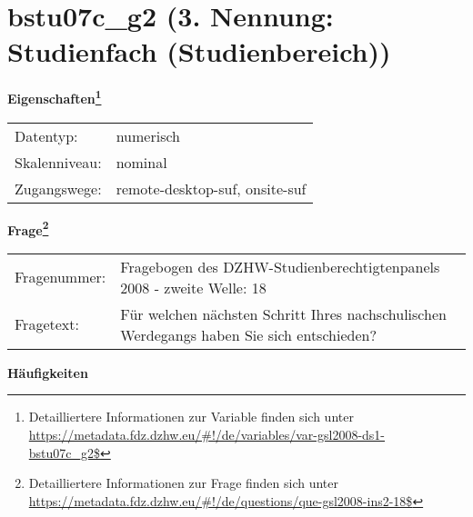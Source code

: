 
    \setcounter{footnote}{0}

    \vspace*{-1.8cm}
	\section{bstu07c\_g2 (3. Nennung: Studienfach (Studienbereich))}
	\label{section:bstu07c_g2}



    \vspace*{0.5cm}
    \noindent\textbf{Eigenschaften\footnote{Detailliertere Informationen zur Variable finden sich unter
		\url{https://metadata.fdz.dzhw.eu/\#!/de/variables/var-gsl2008-ds1-bstu07c_g2$}}}\\
	\begin{tabularx}{\hsize}{@{}lX}
	Datentyp: & numerisch \\
	Skalenniveau: & nominal \\
	Zugangswege: &
	  remote-desktop-suf, 
	  onsite-suf
 \\
    \end{tabularx}



				\vspace*{0.5cm}
                \noindent\textbf{Frage\footnote{Detailliertere Informationen zur Frage finden sich unter
		              \url{https://metadata.fdz.dzhw.eu/\#!/de/questions/que-gsl2008-ins2-18$}}}\\
				\begin{tabularx}{\hsize}{@{}lX}
					Fragenummer: &
					  Fragebogen des DZHW-Studienberechtigtenpanels 2008 - zweite Welle:
					  18
 \\
					Fragetext: & Für welchen nächsten Schritt Ihres nachschulischen Werdegangs haben Sie sich entschieden? \\
				\end{tabularx}





        		\vspace*{0.5cm}
                \noindent\textbf{Häufigkeiten}


